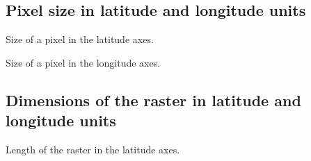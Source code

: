\documentclass[letterpaper,10pt,english]{sphinxmanual}
\begin{document}
\subsection{Pixel size in latitude and longitude units}
\label{\detokenize{usage:pixel-size-in-latitude-and-longitude-units}}

\begin{fulllineitems}
\label{\detokenize{usage:tocdata.TOCData.DeltaLat}}
\pysigstartsignatures
{}
\pysigstopsignatures
\sphinxAtStartPar
Size of a pixel in the latitude axes.

\end{fulllineitems}


\begin{fulllineitems}
\label{\detokenize{usage:tocdata.TOCData.DeltaLon}}
\pysigstartsignatures
{}
\pysigstopsignatures
\sphinxAtStartPar
Size of a pixel in the longitude axes.

\end{fulllineitems}



\subsection{Dimensions of the raster in latitude and longitude units}
\label{\detokenize{usage:dimensions-of-the-raster-in-latitude-and-longitude-units}}

\begin{fulllineitems}
\label{\detokenize{usage:tocdata.TOCData.lenLat}}
\pysigstartsignatures
{}
\pysigstopsignatures
\sphinxAtStartPar
Length of the raster in the latitude axes.

\end{fulllineitems}
\end{document}
